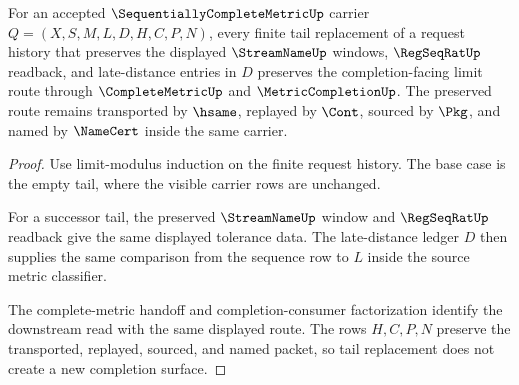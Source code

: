 \begin{theorem}
\label{thm:sequentially-complete-metric-tail-stability}
For an accepted $\SequentiallyCompleteMetricUp$ carrier $Q=(X,S,M,L,D,H,C,P,N)$, every finite tail replacement of a request history that preserves the displayed $\StreamNameUp$ windows, $\RegSeqRatUp$ readback, and late-distance entries in $D$ preserves the completion-facing limit route through $\CompleteMetricUp$ and $\MetricCompletionUp$. The preserved route remains transported by $\hsame$, replayed by $\Cont$, sourced by $\Pkg$, and named by $\NameCert$ inside the same carrier.
\end{theorem}
\begin{proof}
Use limit-modulus induction on the finite request history. The base case is the empty tail, where the visible carrier rows are unchanged.

For a successor tail, the preserved $\StreamNameUp$ window and $\RegSeqRatUp$ readback give the same displayed tolerance data. The late-distance ledger $D$ then supplies the same comparison from the sequence row to $L$ inside the source metric classifier.

The complete-metric handoff and completion-consumer factorization identify the downstream read with the same displayed route. The rows $H,C,P,N$ preserve the transported, replayed, sourced, and named packet, so tail replacement does not create a new completion surface.
\end{proof}

